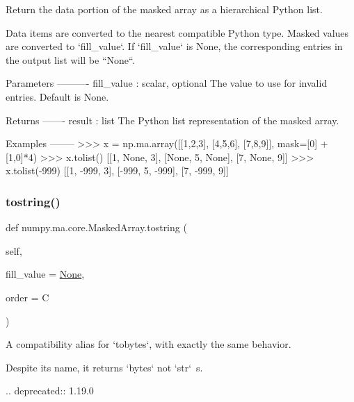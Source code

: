 \begin{DoxyVerb}Return the data portion of the masked array as a hierarchical Python list.

Data items are converted to the nearest compatible Python type.
Masked values are converted to `fill_value`. If `fill_value` is None,
the corresponding entries in the output list will be ``None``.

Parameters
----------
fill_value : scalar, optional
    The value to use for invalid entries. Default is None.

Returns
-------
result : list
    The Python list representation of the masked array.

Examples
--------
>>> x = np.ma.array([[1,2,3], [4,5,6], [7,8,9]], mask=[0] + [1,0]*4)
>>> x.tolist()
[[1, None, 3], [None, 5, None], [7, None, 9]]
>>> x.tolist(-999)
[[1, -999, 3], [-999, 5, -999], [7, -999, 9]]\end{DoxyVerb}
 \mbox{\label{classnumpy_1_1ma_1_1core_1_1MaskedArray_acc5fba0f4f112f4bb10fc450e8a483cc}} 
\subsubsection{\texorpdfstring{tostring()}{tostring()}}
{\footnotesize\ttfamily def numpy.\+ma.\+core.\+Masked\+Array.\+tostring (\begin{DoxyParamCaption}\item[{}]{self,  }\item[{}]{fill\+\_\+value = {\ttfamily \hyperlink{namespacenumpy_1_1ma_1_1core_a647ee1848dfa3692fe35a663a2aa40b3}{None}},  }\item[{}]{order = {\ttfamily \textquotesingle{}C\textquotesingle{}} }\end{DoxyParamCaption})}

\begin{DoxyVerb}A compatibility alias for `tobytes`, with exactly the same behavior.

Despite its name, it returns `bytes` not `str`\ s.

.. deprecated:: 1.19.0
\end{DoxyVerb}
 \mbox{\label{classnumpy_1_1ma_1_1core_1_1MaskedArray_abaa23c4f6196ff1c127fb41cb107762b}} 
